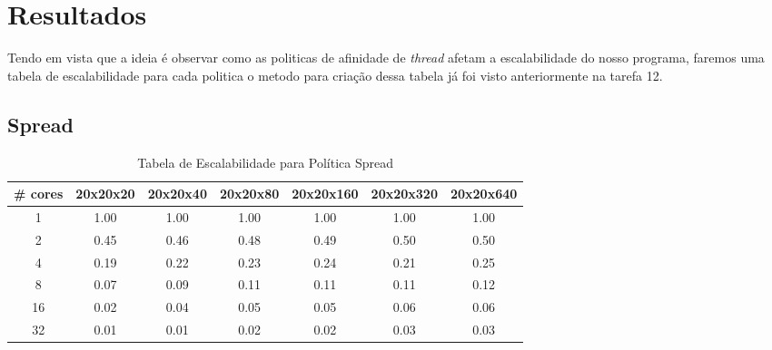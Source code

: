 \documentclass[a4paper, 12pt]{article}
\begin{document}
	\section{Resultados}
	Tendo em vista que a ideia é observar como as politicas de afinidade de \textit{thread} afetam a escalabilidade do nosso programa, faremos uma tabela de escalabilidade para cada politica o metodo para criação dessa tabela já foi visto anteriormente na tarefa 12.
	
	
	\subsection{Spread}
	\begin{table}[h!]
		\centering
		\begin{tabular}{|c|c|c|c|c|c|c|}
			\hline
			\textbf{\# cores} & \textbf{20x20x20} & \textbf{20x20x40} & \textbf{20x20x80} & \textbf{20x20x160} & \textbf{20x20x320} & \textbf{20x20x640} \\ \hline
			1                 & 1.00              & 1.00              & 1.00              & 1.00               & 1.00               & 1.00               \\ \hline
			2                 & 0.45              & 0.46              & 0.48              & 0.49               & 0.50               & 0.50               \\ \hline
			4                 & 0.19              & 0.22              & 0.23              & 0.24               & 0.21               & 0.25               \\ \hline
			8                 & 0.07              & 0.09              & 0.11              & 0.11               & 0.11               & 0.12               \\ \hline
			16                & 0.02              & 0.04              & 0.05              & 0.05               & 0.06               & 0.06               \\ \hline
			32                & 0.01              & 0.01              & 0.02              & 0.02               & 0.03               & 0.03               \\ \hline
		\end{tabular}
		\caption{Tabela de Escalabilidade para Política Spread}
		\label{tab:Tabela de Escalabilidade para Política Spread} %
	\end{table}
	
	\FloatBarrier
	
\end{document}
